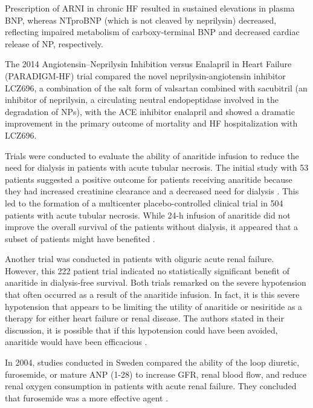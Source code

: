 \documentclass[14pt,a4paper,onecolumn]{extarticle}
\begin{document}
Prescription of ARNI in chronic HF resulted in sustained elevations in plasma BNP, whereas NTproBNP (which is not cleaved by neprilysin) decreased, reflecting impaired metabolism of carboxy-terminal BNP and decreased cardiac release of NP, respectively. \citep{Packer2015}

The 2014 Angiotensin–Neprilysin Inhibition versus Enalapril in Heart Failure (PARADIGM-HF) trial compared the novel neprilysin-angiotensin inhibitor LCZ696, a combination of the salt form of valsartan combined with sacubitril (an inhibitor of neprilysin, a circulating neutral endopeptidase involved in the degradation of NPs), with the ACE inhibitor enalapril and showed a dramatic improvement in the primary outcome of mortality and HF hospitalization with LCZ696. \citep{McMurray2014} %

Trials were conducted to evaluate the ability of anaritide infusion to reduce the need for dialysis in patients with acute tubular necrosis. The initial study with 53 patients suggested a positive outcome for patients receiving anaritide because they had increased creatinine clearance and a decreased need for dialysis \citep{Rahman1994}. This led to the formation of a multicenter placebo-controlled clinical trial in 504 patients with acute tubular necrosis. While 24-h infusion of anaritide did not improve the overall survival of the patients without dialysis, it appeared that a subset of patients might have benefited \citep{Allgren1997}.

Another trial was conducted in patients with oliguric acute renal failure. However, this 222 patient trial indicated no statistically significant benefit of anaritide in dialysis-free survival. Both trials remarked on the severe hypotension that often occurred as a result of the anaritide infusion. In fact, it is this severe hypotension that appears to be limiting the utility of anaritide or nesiritide as a therapy for either heart failure or renal disease. The authors stated in their discussion, it is possible that if this hypotension could have been avoided, anaritide would have been efficacious \citep{Lewis2000}.


In 2004, studies conducted in Sweden compared the ability of the loop diuretic, furosemide, or mature ANP (1-28) to increase GFR, renal blood flow, and reduce renal oxygen consumption in patients with acute renal failure. They concluded that furosemide was a more effective agent \citep{Sward2005}.
\end{document}
